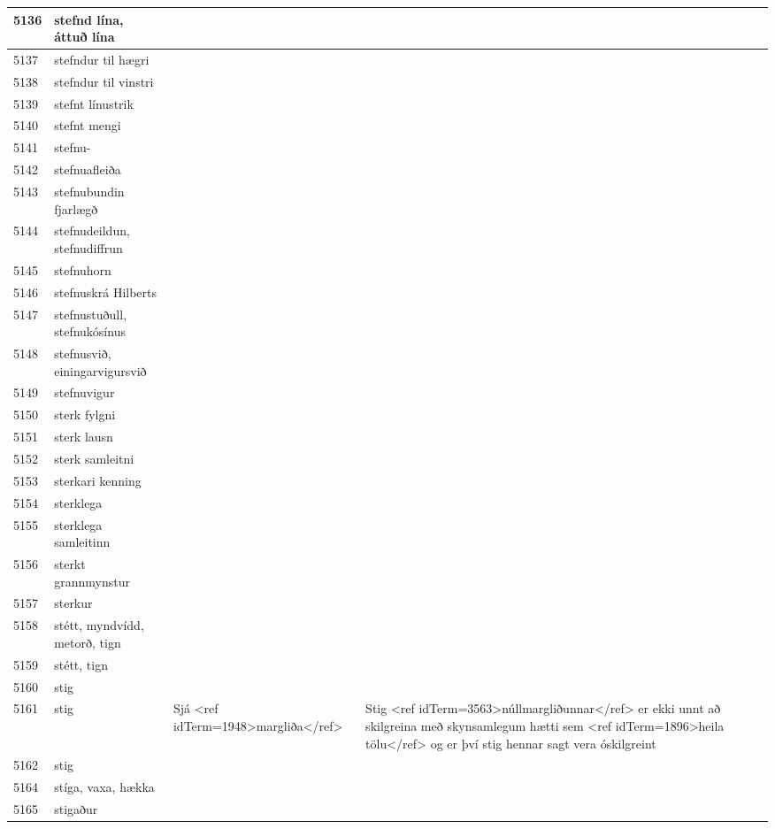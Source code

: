 \begin{longtable}{p{}|p{}|p{}|p{}|p{}}
\hline
5136 & stefnd lína, áttuð lína &  &  &  \\
\hline
5137 & stefndur til hægri &  &  &  \\
\hline
5138 & stefndur til vinstri &  &  &  \\
\hline
5139 & stefnt línustrik &  &  &  \\
\hline
5140 & stefnt mengi &  &  &  \\
\hline
5141 & stefnu- &  &  &  \\
\hline
5142 & stefnuafleiða &  &  &  \\
\hline
5143 & stefnubundin fjarlægð &  &  &  \\
\hline
5144 & stefnudeildun, stefnudiffrun &  &  &  \\
\hline
5145 & stefnuhorn &  &  &  \\
\hline
5146 & stefnuskrá Hilberts &  &  &  \\
\hline
5147 & stefnustuðull, stefnukósínus &  &  &  \\
\hline
5148 & stefnusvið, einingarvigursvið &  &  &  \\
\hline
5149 & stefnuvigur &  &  &  \\
\hline
5150 & sterk fylgni &  &  &  \\
\hline
5151 & sterk lausn &  &  &  \\
\hline
5152 & sterk samleitni &  &  &  \\
\hline
5153 & sterkari kenning &  &  &  \\
\hline
5154 & sterklega &  &  &  \\
\hline
5155 & sterklega samleitinn &  &  &  \\
\hline
5156 & sterkt grannmynstur &  &  &  \\
\hline
5157 & sterkur &  &  &  \\
\hline
5158 & stétt, myndvídd, metorð, tign &  &  &  \\
\hline
5159 & stétt, tign &  &  &  \\
\hline
5160 & stig &  &  &  \\
\hline
5161 & stig & Sjá <ref idTerm=1948>margliða</ref> & Stig <ref idTerm=3563>núllmargliðunnar</ref> er ekki unnt að skilgreina með skynsamlegum hætti sem <ref idTerm=1896>heila tölu</ref> og er því stig hennar sagt vera óskilgreint & \\
\hline
5162 & stig &  &  &  \\
\hline
5164 & stíga, vaxa, hækka &  &  &  \\
\hline
5165 & stigaður &  &  &  \\
\hline

\end{longtable}
